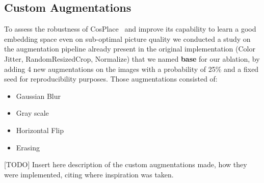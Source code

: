 \documentclass[10pt,twocolumn,letterpaper]{article}
\begin{document}
\subsection{Custom Augmentations}
To assess the robustness of CosPlace~\cite{Berton_CVPR_2022_CosPlace} and improve its capability to learn a good embedding space even on sub-optimal picture quality we conducted a study on the augmentation pipeline already present in the original implementation (Color Jitter, RandomResizedCrop, Normalize) that we named \textbf{base} for our ablation, by adding 4 new augmentations on the images with a probability of 25\% and a fixed seed for reproducibility purposes. Those augmentations consisted of:
\begin{itemize}
  \item Gaussian Blur
  \item Gray scale
  \item Horizontal Flip
  \item Erasing
\end{itemize}
[TODO] Insert here description of the custom augmentations made, how they were implemented, citing where inspiration was taken.
\end{document}
